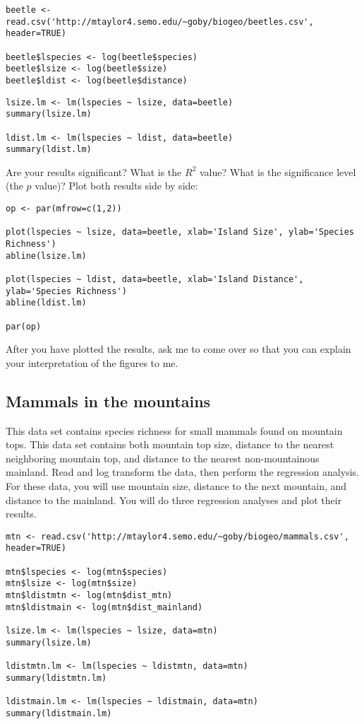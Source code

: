 \documentclass[11pt]{article}
\begin{document}
\begin{verbatim}
beetle <- read.csv('http://mtaylor4.semo.edu/~goby/biogeo/beetles.csv', header=TRUE)

beetle$lspecies <- log(beetle$species)
beetle$lsize <- log(beetle$size)
beetle$ldist <- log(beetle$distance)

\end{verbatim}

\begin{verbatim}
lsize.lm <- lm(lspecies ~ lsize, data=beetle)
summary(lsize.lm)

ldist.lm <- lm(lspecies ~ ldist, data=beetle)
summary(ldist.lm)

\end{verbatim}

Are your results significant?  What is the $R^2$ value?  What is the significance level (the $p$ value)?  Plot both results side by side:

\begin{verbatim}
op <- par(mfrow=c(1,2))

plot(lspecies ~ lsize, data=beetle, xlab='Island Size', ylab='Species Richness')
abline(lsize.lm)

plot(lspecies ~ ldist, data=beetle, xlab='Island Distance', ylab='Species Richness')
abline(ldist.lm)

par(op)
\end{verbatim}

After you have plotted the results, ask me to come over so that you can explain your interpretation of the figures to me.

\subsection*{Mammals in the mountains}

This data set contains species richness for small mammals found on mountain tops. This data set contains both mountain top size, distance to the nearest neighboring mountain top, and distance to the nearest non-mountainous mainland.  Read and log transform the data, then perform the regression analysis.  For these data, you will use mountain size, distance to the next mountain, and distance to the mainland.  You will do three regression analyses and plot their results.


\begin{verbatim}
mtn <- read.csv('http://mtaylor4.semo.edu/~goby/biogeo/mammals.csv', header=TRUE)

mtn$lspecies <- log(mtn$species)
mtn$lsize <- log(mtn$size)
mtn$ldistmtn <- log(mtn$dist_mtn)
mtn$ldistmain <- log(mtn$dist_mainland)

lsize.lm <- lm(lspecies ~ lsize, data=mtn)
summary(lsize.lm)

ldistmtn.lm <- lm(lspecies ~ ldistmtn, data=mtn)
summary(ldistmtn.lm)

ldistmain.lm <- lm(lspecies ~ ldistmain, data=mtn)
summary(ldistmain.lm)

\end{verbatim}
\end{document}

